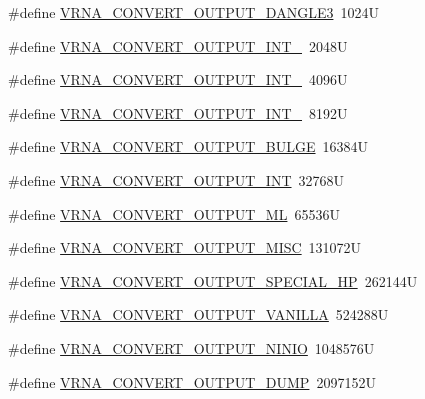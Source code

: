 \begin{DoxyCompactItemize}
\#define \hyperlink{group__energy__parameters__convert_ga34a8a5479ef885834ef32f3fb43d79bc}{V\-R\-N\-A\-\_\-\-C\-O\-N\-V\-E\-R\-T\-\_\-\-O\-U\-T\-P\-U\-T\-\_\-\-D\-A\-N\-G\-L\-E3}~1024\-U
\item 
\#define \hyperlink{group__energy__parameters__convert_ga079aafefd5f8ab57ee5120099a34bd25}{V\-R\-N\-A\-\_\-\-C\-O\-N\-V\-E\-R\-T\-\_\-\-O\-U\-T\-P\-U\-T\-\_\-\-I\-N\-T\-\_}~2048\-U
\item 
\#define \hyperlink{group__energy__parameters__convert_gacf770881d9034431ebe741642342a1f9}{V\-R\-N\-A\-\_\-\-C\-O\-N\-V\-E\-R\-T\-\_\-\-O\-U\-T\-P\-U\-T\-\_\-\-I\-N\-T\-\_}~4096\-U
\item 
\#define \hyperlink{group__energy__parameters__convert_gaa307671e2631cdacad9cbe4c6583b05f}{V\-R\-N\-A\-\_\-\-C\-O\-N\-V\-E\-R\-T\-\_\-\-O\-U\-T\-P\-U\-T\-\_\-\-I\-N\-T\-\_}~8192\-U
\item 
\#define \hyperlink{group__energy__parameters__convert_ga7092fe0be4de6f02cc0bf08e81af726a}{V\-R\-N\-A\-\_\-\-C\-O\-N\-V\-E\-R\-T\-\_\-\-O\-U\-T\-P\-U\-T\-\_\-\-B\-U\-L\-G\-E}~16384\-U
\item 
\#define \hyperlink{group__energy__parameters__convert_gac5c2289fdf8ff1b980976d1613ff943a}{V\-R\-N\-A\-\_\-\-C\-O\-N\-V\-E\-R\-T\-\_\-\-O\-U\-T\-P\-U\-T\-\_\-\-I\-N\-T}~32768\-U
\item 
\#define \hyperlink{group__energy__parameters__convert_gaf2c8755d64eff3852aa45df9ac80a4fe}{V\-R\-N\-A\-\_\-\-C\-O\-N\-V\-E\-R\-T\-\_\-\-O\-U\-T\-P\-U\-T\-\_\-\-M\-L}~65536\-U
\item 
\#define \hyperlink{group__energy__parameters__convert_ga46d5b1535ae86060b6317565b7c6b40b}{V\-R\-N\-A\-\_\-\-C\-O\-N\-V\-E\-R\-T\-\_\-\-O\-U\-T\-P\-U\-T\-\_\-\-M\-I\-S\-C}~131072\-U
\item 
\#define \hyperlink{group__energy__parameters__convert_gaa1ff48a79642d69579d1766561ec6db6}{V\-R\-N\-A\-\_\-\-C\-O\-N\-V\-E\-R\-T\-\_\-\-O\-U\-T\-P\-U\-T\-\_\-\-S\-P\-E\-C\-I\-A\-L\-\_\-\-H\-P}~262144\-U
\item 
\#define \hyperlink{group__energy__parameters__convert_ga0d4e8a836bb4864ab5129c085dbf592d}{V\-R\-N\-A\-\_\-\-C\-O\-N\-V\-E\-R\-T\-\_\-\-O\-U\-T\-P\-U\-T\-\_\-\-V\-A\-N\-I\-L\-L\-A}~524288\-U
\item 
\#define \hyperlink{group__energy__parameters__convert_ga2eb0462f16939ddacdaf751a88d675ce}{V\-R\-N\-A\-\_\-\-C\-O\-N\-V\-E\-R\-T\-\_\-\-O\-U\-T\-P\-U\-T\-\_\-\-N\-I\-N\-I\-O}~1048576\-U
\item 
\#define \hyperlink{group__energy__parameters__convert_gac86976e9c2a55b3a6481ea60044f6098}{V\-R\-N\-A\-\_\-\-C\-O\-N\-V\-E\-R\-T\-\_\-\-O\-U\-T\-P\-U\-T\-\_\-\-D\-U\-M\-P}~2097152\-U
\end{DoxyCompactItemize}
